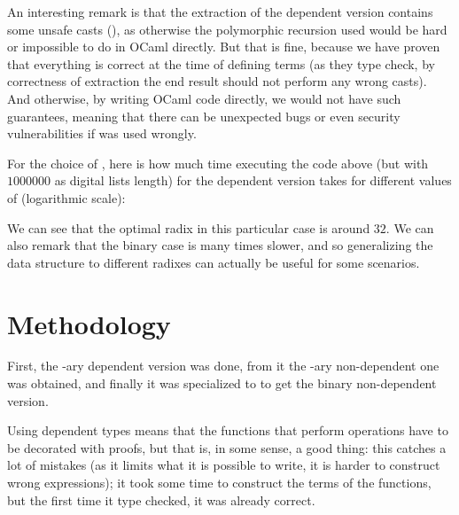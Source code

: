\documentclass{article}
\begin{document}
An interesting remark is that the extraction of the dependent version contains some unsafe casts (), as otherwise the polymorphic recursion used would be hard or impossible to do in OCaml directly. But that is fine, because we have proven that everything is correct at the time of defining terms (as they type check, by correctness of extraction the end result should not perform any wrong casts). And otherwise, by writing OCaml code directly, we would not have such guarantees, meaning that there can be unexpected bugs or even security vulnerabilities if  was used wrongly.

For the choice of , here is how much time executing the code above (but with $1000000$ as digital lists length) for the dependent version takes for different values of  (logarithmic scale):

\begin{center}
\end{center}

We can see that the optimal radix in this particular case is around $32$. We can also remark that the binary case is many times slower, and so generalizing the data structure to different radixes can actually be useful for some scenarios.

\section{Methodology}

First, the -ary dependent version was done, from it the -ary non-dependent one was obtained, and finally it was specialized to  to get the binary non-dependent version.

Using dependent types means that the functions that perform operations have to be decorated with proofs, but that is, in some sense, a good thing: this catches a lot of mistakes (as it limits what it is possible to write, it is harder to construct wrong expressions); it took some time to construct the terms of the functions, but the first time it type checked, it was already correct.
\end{document}
